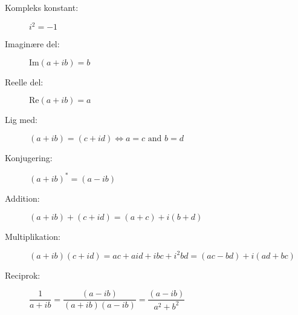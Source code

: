 \documentclass[12pt]{article}
\begin{document}
\begin{description}
\item[Kompleks konstant:] $i^2=-1$
\item[Imaginære del:] $\text{Im}(a+ib)=b$
\item[Reelle del:] $\text{Re}(a+ib)=a$
\item[Lig med:] $(a+ib)=(c+id) \Leftrightarrow a=c \text{ and } b=d$
\item[Konjugering:] $(a+ib)^*=(a-ib)$
\item[Addition:] $(a+ib)+(c+id)=(a+c)+i(b+d)$
\item[Multiplikation:] $(a+ib)(c+id)=ac+aid+ibc+i^2bd=(ac-bd)+i(ad+bc)$
\item[Reciprok:] $\dfrac{1}{a+ib}=\dfrac{(a-ib)}{(a+ib)(a-ib)}=\dfrac{(a-ib)}{a^2+b^2}$
\end{description}
\end{document}
